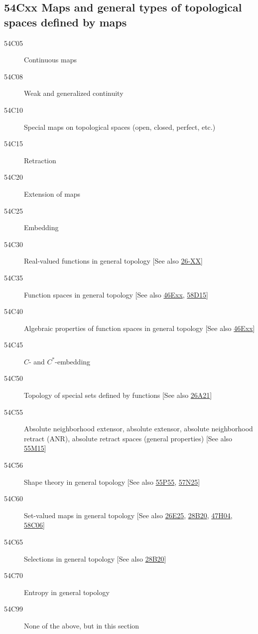 \subsection*{54Cxx  Maps and general types of topological spaces defined by maps }\label{54Cxx}
\begin{description}  
\item [54C05]\label{54C05} Continuous maps
\item [54C08]\label{54C08} Weak and generalized continuity
\item [54C10]\label{54C10} Special maps on topological spaces (open, closed, perfect, etc.)
\item [54C15]\label{54C15} Retraction
\item [54C20]\label{54C20} Extension of maps
\item [54C25]\label{54C25} Embedding
\item [54C30]\label{54C30} Real-valued functions in general topology [See also \hyperref[26-XX]{26-XX}]
\item [54C35]\label{54C35} Function spaces in general topology [See also \hyperref[46Exx]{46Exx}, \hyperref[58D15]{58D15}]
\item [54C40]\label{54C40} Algebraic properties of function spaces in general topology [See also \hyperref[46Exx]{46Exx}]
\item [54C45]\label{54C45} $C$- and $C^*$-embedding
\item [54C50]\label{54C50} Topology of special sets defined by functions [See also \hyperref[26A21]{26A21}]
\item [54C55]\label{54C55} Absolute neighborhood extensor, absolute extensor, absolute neighborhood retract (ANR), absolute retract spaces (general properties) [See also \hyperref[55M15]{55M15}]
\item [54C56]\label{54C56} Shape theory in general topology [See also \hyperref[55P55]{55P55}, \hyperref[57N25]{57N25}]
\item [54C60]\label{54C60} Set-valued maps in general topology [See also \hyperref[26E25]{26E25}, \hyperref[28B20]{28B20}, \hyperref[47H04]{47H04}, \hyperref[58C06]{58C06}]
\item [54C65]\label{54C65} Selections in general topology [See also \hyperref[28B20]{28B20}]
\item [54C70]\label{54C70} Entropy in general topology
\item [54C99]\label{54C99} None of the above, but in this section
\end{description}
